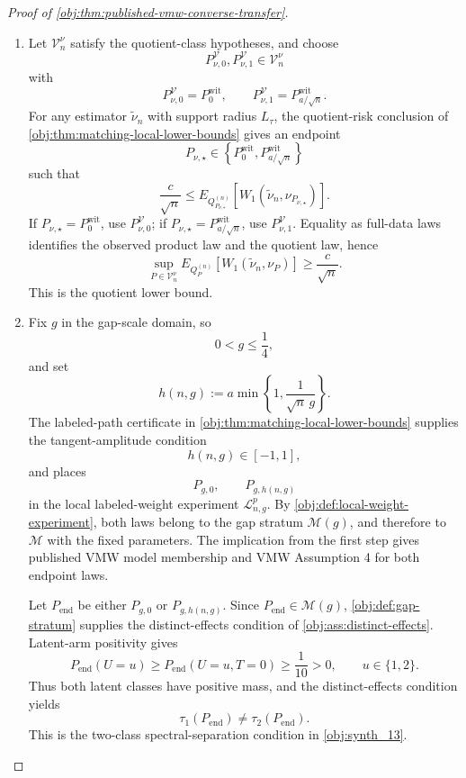 \begin{proof}[Proof of \cref{obj:thm:published-vmw-converse-transfer}]
\begin{enumerate}
\item Let \(\mathcal V_n^\nu\) satisfy the quotient-class hypotheses, and choose
\[
P_{\nu,0}^{\mathcal V},P_{\nu,1}^{\mathcal V}\in\mathcal V_n^\nu
\]
with
\[
P_{\nu,0}^{\mathcal V}=P_0^{\mathrm{wit}},
\qquad
P_{\nu,1}^{\mathcal V}=P_{a/\sqrt n}^{\mathrm{wit}}.
\]
For any estimator \(\widetilde\nu_n\) with support radius \(L_\tau\), the quotient-risk conclusion of \cref{obj:thm:matching-local-lower-bounds} gives an endpoint
\[
P_{\nu,\star}\in
\left\{P_0^{\mathrm{wit}},P_{a/\sqrt n}^{\mathrm{wit}}\right\}
\]
such that
\[
\frac{c}{\sqrt n}
\le
E_{Q_{P_{\nu,\star}}^{(n)}}\!\left[
W_1\!\left(\widetilde\nu_n,\nu_{P_{\nu,\star}}\right)
\right].
\]
If \(P_{\nu,\star}=P_0^{\mathrm{wit}}\), use \(P_{\nu,0}^{\mathcal V}\); if
\(P_{\nu,\star}=P_{a/\sqrt n}^{\mathrm{wit}}\), use \(P_{\nu,1}^{\mathcal V}\).  Equality as full-data laws identifies the observed product law and the quotient law, hence
\[
\sup_{P\in\mathcal V_n^\nu}
E_{Q_P^{(n)}}\!\left[
W_1\!\left(\widetilde\nu_n,\nu_P\right)
\right]
\ge
\frac{c}{\sqrt n}.
\]
This is the quotient lower bound. %

\item Fix \(g\) in the gap-scale domain, so
\[
0<g\le\frac14,
\]
and set
\[
h(n,g):=
a\min\left\{1,\frac{1}{\sqrt n\,g}\right\}.
\]
The labeled-path certificate in \cref{obj:thm:matching-local-lower-bounds} supplies the tangent-amplitude condition
\[
h(n,g)\in[-1,1],
\]
and places
\[
P_{g,0},
\qquad
P_{g,h(n,g)}
\]
in the local labeled-weight experiment \(\mathcal L_{n,g}^p\).  By \cref{obj:def:local-weight-experiment}, both laws belong to the gap stratum \(\mathcal M(g)\), and therefore to \(\mathcal M\) with the fixed parameters.  The implication from the first step gives published VMW model membership and VMW Assumption 4 for both endpoint laws.

Let \(P_{\mathrm{end}}\) be either \(P_{g,0}\) or \(P_{g,h(n,g)}\).  Since \(P_{\mathrm{end}}\in\mathcal M(g)\), \cref{obj:def:gap-stratum} supplies the distinct-effects condition of \cref{obj:ass:distinct-effects}.  Latent-arm positivity gives
\[
P_{\mathrm{end}}(U=u)
\ge
P_{\mathrm{end}}(U=u,T=0)
\ge \frac1{10}>0,
\qquad u\in\{1,2\}.
\]
Thus both latent classes have positive mass, and the distinct-effects condition yields
\[
\tau_1(P_{\mathrm{end}})\ne \tau_2(P_{\mathrm{end}}).
\]
This is the two-class spectral-separation condition in \cref{obj:synth_13}. %


\end{enumerate}
\end{proof}
